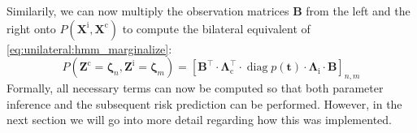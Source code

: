 \documentclass[\relativeRoot/main.tex]{subfiles}
\begin{document}
Similarily, we can now multiply the observation matrices $\mathbf{B}$ from the left and the right onto $P \left( \mathbf{X}^\text{i}, \mathbf{X}^\text{c} \right)$ to compute the bilateral equivalent of \cref{eq:unilateral:hmm_marginalize}:
%
\begin{equation} \label{eq:bilateral:expand:observation}
    P \left( \mathbf{Z}^\text{c} = \boldsymbol{\zeta}_n, \mathbf{Z}^\text{i} = \boldsymbol{\zeta}_m \right) = \left[ \mathbf{B}^\top \cdot \boldsymbol{\Lambda}_\text{c}^\top \cdot \operatorname{diag}{p(\mathbf{t})} \cdot \boldsymbol{\Lambda}_\text{i} \cdot \mathbf{B} \right]_{n,m}
\end{equation}
%
Formally, all necessary terms can now be computed so that both parameter inference and the subsequent risk prediction can be performed. However, in the next section we will go into more detail regarding how this was implemented.
\end{document}
